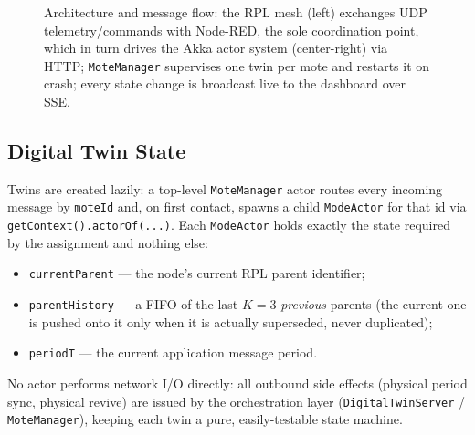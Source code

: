 \begin{figure}[h]
{
}
\caption{Architecture and message flow: the RPL mesh (left) exchanges UDP telemetry/commands
  with Node-RED, the sole coordination point, which in turn drives the Akka actor system
  (center-right) via HTTP; \texttt{MoteManager} supervises one twin per mote and restarts it
  on crash; every state change is broadcast live to the dashboard over SSE.}
\label{fig:arch}
\end{figure}

\subsection*{Digital Twin State}
Twins are created lazily: a top-level \texttt{MoteManager} actor routes every incoming
message by \texttt{moteId} and, on first contact, spawns a child \texttt{ModeActor} for that
id via \texttt{getContext().actorOf(...)}. Each \texttt{ModeActor} holds exactly the state
required by the assignment and nothing else:
\begin{itemize}
\item \texttt{currentParent} --- the node's current RPL parent identifier;
\item \texttt{parentHistory} --- a FIFO of the last $K{=}3$ \emph{previous} parents (the
  current one is pushed onto it only when it is actually superseded, never duplicated);
\item \texttt{periodT} --- the current application message period.
\end{itemize}
No actor performs network I/O directly: all outbound side effects (physical period sync,
physical revive) are issued by the orchestration layer (\texttt{DigitalTwinServer} /
\texttt{MoteManager}), keeping each twin a pure, easily-testable state machine.
